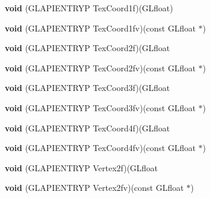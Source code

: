 \begin{DoxyCompactItemize}
{\bfseries void} (G\+L\+A\+P\+I\+E\+N\+T\+R\+YP Tex\+Coord1f)(G\+Lfloat)
\item 
\mbox{\label{struct_g_lvertexformat_a32799f52d8089e11c5ea803ae2720e2c}} 
{\bfseries void} (G\+L\+A\+P\+I\+E\+N\+T\+R\+YP Tex\+Coord1fv)(const G\+Lfloat $\ast$)
\item 
\mbox{\label{struct_g_lvertexformat_ad871abfc08fc0567641af8fa9dba635c}} 
{\bfseries void} (G\+L\+A\+P\+I\+E\+N\+T\+R\+YP Tex\+Coord2f)(G\+Lfloat
\item 
\mbox{\label{struct_g_lvertexformat_aed674c41c0c198b5e594f0a2c7330aa6}} 
{\bfseries void} (G\+L\+A\+P\+I\+E\+N\+T\+R\+YP Tex\+Coord2fv)(const G\+Lfloat $\ast$)
\item 
\mbox{\label{struct_g_lvertexformat_ab54ae0b9446a1d4ec9f1822e05b52831}} 
{\bfseries void} (G\+L\+A\+P\+I\+E\+N\+T\+R\+YP Tex\+Coord3f)(G\+Lfloat
\item 
\mbox{\label{struct_g_lvertexformat_afbbc5bbcad7d7546b279eea521ae2a23}} 
{\bfseries void} (G\+L\+A\+P\+I\+E\+N\+T\+R\+YP Tex\+Coord3fv)(const G\+Lfloat $\ast$)
\item 
\mbox{\label{struct_g_lvertexformat_a06aae57deb0f3be06091ed67732b3a39}} 
{\bfseries void} (G\+L\+A\+P\+I\+E\+N\+T\+R\+YP Tex\+Coord4f)(G\+Lfloat
\item 
\mbox{\label{struct_g_lvertexformat_ad6c50df6bffa6bf21f5320e3b6dde2fa}} 
{\bfseries void} (G\+L\+A\+P\+I\+E\+N\+T\+R\+YP Tex\+Coord4fv)(const G\+Lfloat $\ast$)
\item 
\mbox{\label{struct_g_lvertexformat_ab85988f08721f7d5fcf0ac4bc7923dc4}} 
{\bfseries void} (G\+L\+A\+P\+I\+E\+N\+T\+R\+YP Vertex2f)(G\+Lfloat
\item 
\mbox{\label{struct_g_lvertexformat_a4539241c0f6e667b72e0688e06831f6c}} 
{\bfseries void} (G\+L\+A\+P\+I\+E\+N\+T\+R\+YP Vertex2fv)(const G\+Lfloat $\ast$)
\item 
\mbox{\label{struct_g_lvertexformat_a47a3b40f2d76bdfe8539533900555f8b}} 

\end{DoxyCompactItemize}
